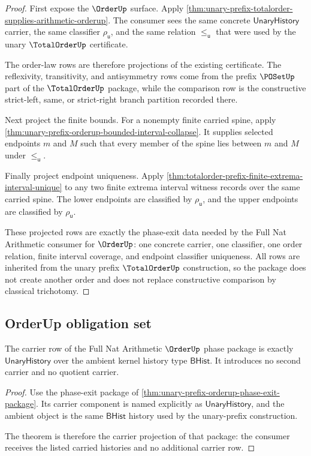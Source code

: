 \begin{proof}
First expose the $\OrderUp$ surface. Apply
\autoref{thm:unary-prefix-totalorder-supplies-arithmetic-orderup}. The consumer
sees the same concrete $\mathsf{UnaryHistory}$ carrier, the same classifier
$\rho_{\mathsf{u}}$, and the same relation $\le_{\mathsf{u}}$ that were used
by the unary $\TotalOrderUp$ certificate.

The order-law rows are therefore projections of the existing certificate. The
reflexivity, transitivity, and antisymmetry rows come from the prefix
$\POSetUp$ part of the $\TotalOrderUp$ package, while the comparison row is
the constructive strict-left, same, or strict-right branch partition recorded
there.

Next project the finite bounds. For a nonempty finite carried spine, apply
\autoref{thm:unary-prefix-orderup-bounded-interval-collapse}. It supplies
selected endpoints $m$ and $M$ such that every member of the spine lies between
$m$ and $M$ under $\le_{\mathsf{u}}$.

Finally project endpoint uniqueness. Apply
\autoref{thm:totalorder-prefix-finite-extrema-interval-unique} to any two
finite extrema interval witness records over the same carried spine. The lower
endpoints are classified by $\rho_{\mathsf{u}}$, and the upper endpoints are
classified by $\rho_{\mathsf{u}}$.

These projected rows are exactly the phase-exit data needed by the Full Nat
Arithmetic consumer for $\OrderUp$: one concrete carrier, one classifier, one
order relation, finite interval coverage, and endpoint classifier uniqueness.
All rows are inherited from the unary prefix $\TotalOrderUp$ construction, so
the package does not create another order and does not replace constructive
comparison by classical trichotomy.
\end{proof}

\subsection{OrderUp obligation set}
\label{sec:totalorder-orderup-obligation-set}

\begin{theorem}
\label{thm:unary-prefix-orderup-carrier-obligation}
The carrier row of the Full Nat Arithmetic $\OrderUp$ phase package is exactly
$\mathsf{UnaryHistory}$ over the ambient kernel history type $\mathsf{BHist}$.
It introduces no second carrier and no quotient carrier.
\end{theorem}
\begin{proof}
Use the phase-exit package of
\autoref{thm:unary-prefix-orderup-phase-exit-package}. Its carrier component
is named explicitly as $\mathsf{UnaryHistory}$, and the ambient object is the
same $\mathsf{BHist}$ history used by the unary-prefix construction.

The theorem is therefore the carrier projection of that package: the consumer
receives the listed carried histories and no additional carrier row.
\end{proof}

